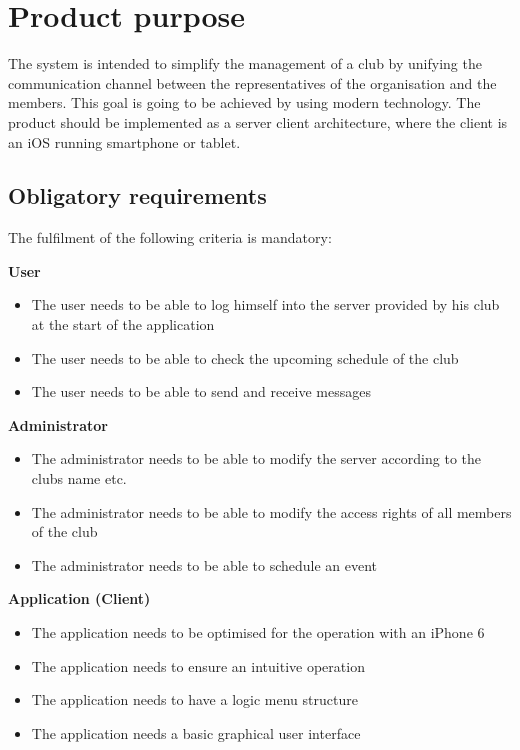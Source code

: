 \pagestyle{fancy}
\lhead{}
\renewcommand{\headrulewidth}{0pt}
\setlength{\headheight}{14pt}

\chapter{Product purpose}

The system is intended to simplify the management of a club by unifying the communication channel between the representatives of the organisation and the members. This goal is going to be achieved by using modern technology. The product should be implemented as a server client architecture, where the client is an iOS running smartphone or tablet.

\section{Obligatory requirements} %
The fulfilment of the following criteria is mandatory:

\textbf{User}
\begin{itemize}
\item The user needs to be able to log himself into the server provided by his club at the start of the application
\item The user needs to be able to check the upcoming schedule of the club
\item The user needs to be able to send and receive messages
\end{itemize}

\textbf{Administrator}
\begin{itemize}
\item The administrator needs to be able to modify the server according to the clubs name etc.
\item The administrator needs to be able to modify the access rights of all members of the club
\item The administrator needs to be able to schedule an event
\end{itemize}

\textbf{Application (Client)}
\begin{itemize}
\item The application needs to be optimised for the operation with an iPhone 6
\item The application needs to ensure an intuitive operation
\item The application needs to have a logic menu structure
\item The application needs a basic graphical user interface
\end{itemize}

